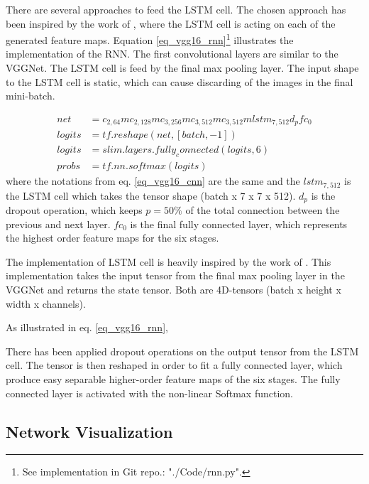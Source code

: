 There are several approaches to feed the LSTM cell. The chosen approach has been inspired by the work of  \cite{git_rnn_cnn_1,43455}, where the LSTM cell is acting on each of the generated feature maps.
Equation \ref{eq_vgg16_rnn}\footnote{See implementation in Git repo.: "./Code/rnn.py".}  illustrates the implementation of the RNN. The first convolutional layers are similar to the VGGNet. The LSTM cell is feed by the final max pooling layer. The input shape to the LSTM cell is static, which can cause discarding of the images in the final mini-batch.

\begin{equation}
\begin{aligned}
net &= c_{2,64}mc_{2,128}mc_{3,256}mc_{3,512}mc_{3,512}m lstm_{7,512} d_p fc_0\\
logits &=  tf.reshape(net, [batch, -1])\\
logits &= slim.layers.fully_connected(logits, 6) \\
probs &= tf.nn.softmax(logits)
\end{aligned}
\label{eq_vgg16_rnn}
\end{equation}
where the notations from eq. \ref{eq_vgg16_cnn} are the same and the $lstm_{7,512}$ is the LSTM cell   which takes the tensor shape (batch x 7 x 7 x 512). $d_p$ is the dropout operation, which keeps  $p = 50\%$ of the total connection between the previous and next layer. $fc_0$ is the final fully connected layer, which represents the highest order feature maps for the six stages.

The implementation of LSTM cell is heavily inspired by the work of \cite{git_lstm}. This implementation takes the input tensor from the final max pooling layer in the VGGNet and returns the state tensor. Both are 4D-tensors (batch x height x width x channels).

As illustrated in eq. \ref{eq_vgg16_rnn}, 

There has been applied dropout operations on the output tensor from the LSTM cell. The tensor is then reshaped in order to fit a fully connected layer, which produce easy separable higher-order feature maps of the six stages. The fully connected layer is activated with the non-linear Softmax function.

\subsection{Network Visualization}

